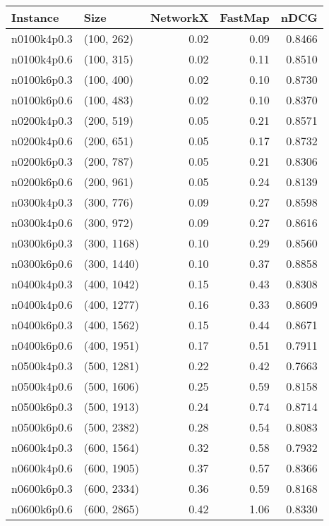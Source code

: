 \begin{tabular}{llrrr}
\toprule
   Instance &          Size &  NetworkX &  FastMap &   nDCG \\
\midrule
n0100k4p0.3 &    (100, 262) &      0.02 &     0.09 & 0.8466 \\
n0100k4p0.6 &    (100, 315) &      0.02 &     0.11 & 0.8510 \\
n0100k6p0.3 &    (100, 400) &      0.02 &     0.10 & 0.8730 \\
n0100k6p0.6 &    (100, 483) &      0.02 &     0.10 & 0.8370 \\
n0200k4p0.3 &    (200, 519) &      0.05 &     0.21 & 0.8571 \\
n0200k4p0.6 &    (200, 651) &      0.05 &     0.17 & 0.8732 \\
n0200k6p0.3 &    (200, 787) &      0.05 &     0.21 & 0.8306 \\
n0200k6p0.6 &    (200, 961) &      0.05 &     0.24 & 0.8139 \\
n0300k4p0.3 &    (300, 776) &      0.09 &     0.27 & 0.8598 \\
n0300k4p0.6 &    (300, 972) &      0.09 &     0.27 & 0.8616 \\
n0300k6p0.3 &   (300, 1168) &      0.10 &     0.29 & 0.8560 \\
n0300k6p0.6 &   (300, 1440) &      0.10 &     0.37 & 0.8858 \\
n0400k4p0.3 &   (400, 1042) &      0.15 &     0.43 & 0.8308 \\
n0400k4p0.6 &   (400, 1277) &      0.16 &     0.33 & 0.8609 \\
n0400k6p0.3 &   (400, 1562) &      0.15 &     0.44 & 0.8671 \\
n0400k6p0.6 &   (400, 1951) &      0.17 &     0.51 & 0.7911 \\
n0500k4p0.3 &   (500, 1281) &      0.22 &     0.42 & 0.7663 \\
n0500k4p0.6 &   (500, 1606) &      0.25 &     0.59 & 0.8158 \\
n0500k6p0.3 &   (500, 1913) &      0.24 &     0.74 & 0.8714 \\
n0500k6p0.6 &   (500, 2382) &      0.28 &     0.54 & 0.8083 \\
n0600k4p0.3 &   (600, 1564) &      0.32 &     0.58 & 0.7932 \\
n0600k4p0.6 &   (600, 1905) &      0.37 &     0.57 & 0.8366 \\
n0600k6p0.3 &   (600, 2334) &      0.36 &     0.59 & 0.8168 \\
n0600k6p0.6 &   (600, 2865) &      0.42 &     1.06 & 0.8330 \\

\end{tabular}
